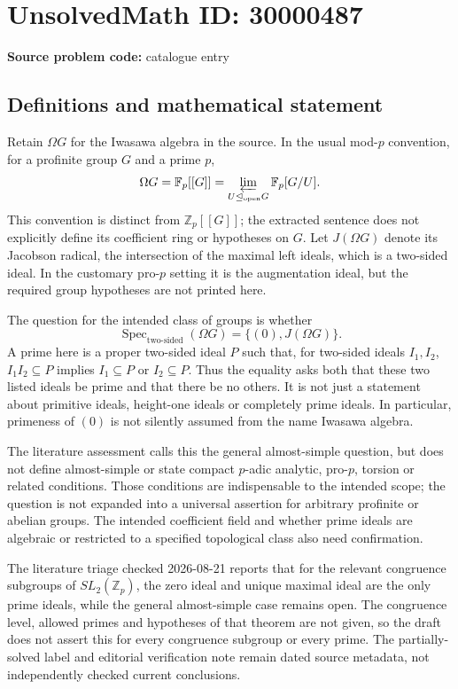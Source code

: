 \documentclass[11pt]{article}
\newcommand{\Z}{\mathbb{Z}}
\newcommand{\F}{\mathbb{F}}
\begin{document}
\section*{UnsolvedMath ID: 30000487}
\textbf{Source problem code:} catalogue entry
\subsection{Definitions and mathematical statement}
Retain \(\Omega G\) for the Iwasawa algebra in the source. In the usual mod-\(p\) convention, for a profinite group \(G\) and a prime \(p\),
\[
 \Omega G=\F_p[[G]]=\varprojlim_{U\trianglelefteq_{\mathrm{open}}G}\F_p[G/U].
\]
This convention is distinct from \(\Z_p[[G]]\); the extracted sentence does not explicitly define its coefficient ring or hypotheses on \(G\). Let \(J(\Omega G)\) denote its Jacobson radical, the intersection of the maximal left ideals, which is a two-sided ideal. In the customary pro-\(p\) setting it is the augmentation ideal, but the required group hypotheses are not printed here.

The question for the intended class of groups is whether
\[
 \operatorname{Spec}_{\mathrm{two\text{-}sided}}(\Omega G)
 =\{(0),J(\Omega G)\}.
\]
A prime here is a proper two-sided ideal \(P\) such that, for two-sided ideals \(I_1,I_2\), \(I_1I_2\subseteq P\) implies \(I_1\subseteq P\) or \(I_2\subseteq P\). Thus the equality asks both that these two listed ideals be prime and that there be no others. It is not just a statement about primitive ideals, height-one ideals or completely prime ideals. In particular, primeness of \((0)\) is not silently assumed from the name Iwasawa algebra.

The literature assessment calls this the general almost-simple question, but does not define almost-simple or state compact \(p\)-adic analytic, pro-\(p\), torsion or related conditions. Those conditions are indispensable to the intended scope; the question is not expanded into a universal assertion for arbitrary profinite or abelian groups. The intended coefficient field and whether prime ideals are algebraic or restricted to a specified topological class also need confirmation.

The literature triage checked 2026-08-21 reports that for the relevant congruence subgroups of \(SL_2(\Z_p)\), the zero ideal and unique maximal ideal are the only prime ideals, while the general almost-simple case remains open. The congruence level, allowed primes and hypotheses of that theorem are not given, so the draft does not assert this for every congruence subgroup or every prime. The partially-solved label and editorial verification note remain dated source metadata, not independently checked current conclusions.
\end{document}
